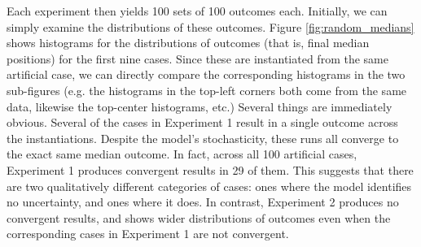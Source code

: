 Each experiment then yields 100 sets of 100 outcomes each. Initially, we can simply examine the distributions of these outcomes. Figure \ref{fig:random_medians} shows histograms for the distributions of outcomes (that is, final median positions) for the first nine cases. Since these are instantiated from the same artificial case, we can directly compare the corresponding histograms in the two sub-figures (e.g. the histograms in the top-left corners both come from the same data, likewise the top-center histograms, etc.) Several things are immediately obvious. Several of the cases in Experiment 1 result in a single outcome across the instantiations. Despite the model's stochasticity, these runs all converge to the exact same median outcome. In fact, across all 100 artificial cases, Experiment 1 produces convergent results in 29 of them. This suggests that there are two qualitatively different categories of cases: ones where the model identifies no uncertainty, and ones where it does. In contrast, Experiment 2 produces no convergent results, and shows wider distributions of outcomes even when the corresponding cases in Experiment 1 are not convergent.

